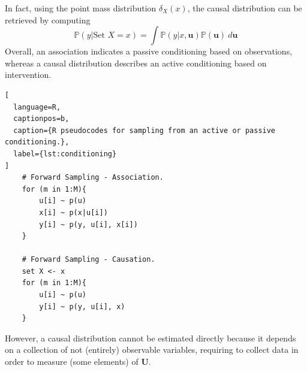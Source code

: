 \documentclass{report}
\begin{document}

\noindent In fact, using the point mass distribution $\displaystyle \delta_X(x)$, the causal distribution can be retrieved by computing
\[\mathbb{P}(y|\text{Set } X = x) = \int \mathbb{P}(y|x, \mathbf{u})\mathbb{P}(\mathbf{u}) \ d\mathbf{u}\]
Overall, an association indicates a passive conditioning based on observations, whereas a causal distribution describes an active conditioning based on intervention.
\begin{lstlisting}[
  language=R,
  captionpos=b,
  caption={R pseudocodes for sampling from an active or passive conditioning.},
  label={lst:conditioning}
]
    # Forward Sampling - Association.
    for (m in 1:M){
        u[i] ~ p(u)
        x[i] ~ p(x|u[i])
        y[i] ~ p(y, u[i], x[i])
    }
    
    # Forward Sampling - Causation.
    set X <- x
    for (m in 1:M){
        u[i] ~ p(u)
        y[i] ~ p(y, u[i], x)
    }
\end{lstlisting}
\noindent However, a causal distribution cannot be estimated directly because it depends on a collection of not (entirely) observable variables, requiring to collect data in order to measure (some elements) of $\displaystyle \mathbf{U}$.
\end{document}
